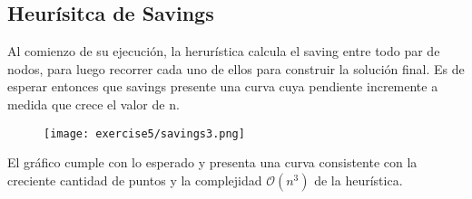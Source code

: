\subsection{Heurísitca de Savings}

Al comienzo de su ejecución, la herurística calcula el saving entre todo par de nodos, para luego recorrer cada uno de ellos para construir la solución final. Es de esperar entonces que savings presente una curva cuya pendiente incremente a medida que crece el valor de n.

\begin{figure}[H]
	\centering
	\texttt{[image: exercise5/savings3.png]}
\end{figure}

El gráfico cumple con lo esperado y presenta una curva consistente con la creciente cantidad de puntos y la complejidad $\mathcal{O}(n^{3})$ de la heurística.